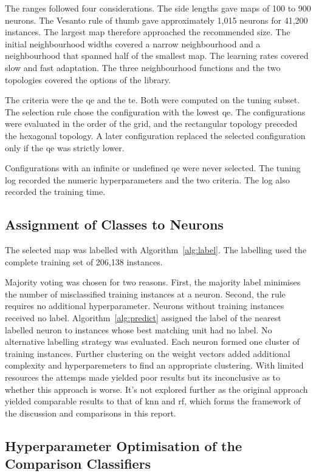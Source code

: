 \documentclass[conference]{IEEEtran}
\begin{document}
The ranges followed four considerations.
The side lengths gave maps of 100 to 900 neurons.
The Vesanto rule of thumb gave approximately 1,015 neurons for 41,200 instances.
The largest map therefore approached the recommended size.
The initial neighbourhood widths covered a narrow neighbourhood and a neighbourhood that spanned half of the smallest map.
The learning rates covered slow and fast adaptation.
The three neighbourhood functions and the two topologies covered the options of the library.

The criteria were the \gls{qe} and the \gls{te}.
Both were computed on the tuning subset.
The selection rule chose the configuration with the lowest \gls{qe}.
The configurations were evaluated in the order of the grid, and the rectangular topology preceded the hexagonal topology.
A later configuration replaced the selected configuration only if the \gls{qe} was strictly lower.

Configurations with an infinite or undefined \gls{qe} were never selected.
The tuning log recorded the numeric hyperparameters and the two criteria.
The log also recorded the training time.

\subsection{Assignment of Classes to Neurons}
\label{sub:labelproc}

The selected map was labelled with Algorithm~\ref{alg:label}.
The labelling used the complete training set of 206,138 instances.

Majority voting was chosen for two reasons.
First, the majority label minimises the number of misclassified training instances at a neuron.
Second, the rule requires no additional hyperparameter.
Neurons without training instances received no label.
Algorithm~\ref{alg:predict} assigned the label of the nearest labelled neuron to instances whose best matching unit had no label.
No alternative labelling strategy was evaluated.
Each neuron formed one cluster of training instances.
Further clustering on the weight vectors added additional complexity and hyperparemeters to find an appropriate clustering.
With limited resources the attemps made yielded poor results but its inconclusive as to whether this approach is worse.
It's not explored further as the original approach yielded comparable results to that of \gls{knn} and \gls{rf}, which
forms the framework of the discussion and comparisons in this report.

\subsection{Hyperparameter Optimisation of the Comparison Classifiers}
\label{sub:clftune}
\end{document}
